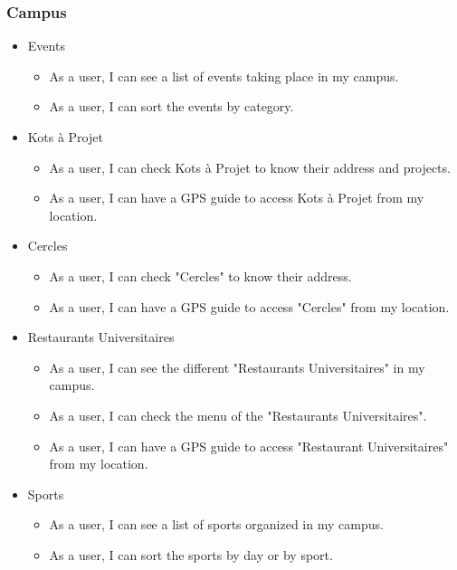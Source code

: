 \documentclass[11pt, a4paper]{report}
\begin{document}
\subsubsection{Campus}

\begin{itemize}

\item{Events}
\begin{itemize} 
\item As a user, I can see a list of events taking place in my campus.
\item As a user, I can sort the events by category.
\end{itemize}

\item{Kots à Projet}
\begin{itemize}
\item As a user, I can check Kots à Projet to know their address and projects.
\item As a user, I can have a GPS guide to access Kots à Projet from my location.
\end{itemize}

\item{Cercles}
\begin{itemize}
\item As a user, I can check "Cercles" to know their address.
\item As a user, I can have a GPS guide to access "Cercles" from my location.
\end{itemize}

\item{Restaurants Universitaires}
\begin{itemize}
\item As a user, I can see the different "Restaurants Universitaires" in my campus.
\item As a user, I can check the menu of the "Restaurants Universitaires".
\item As a user, I can have a GPS guide to access "Restaurant Universitaires" from my location.
\end{itemize}

\item{Sports}
\begin{itemize}
\item As a user, I can see a list of sports organized in my campus.
\item As a user, I can sort the sports by day or by sport.
\end{itemize}

\end{itemize}
\end{document}
